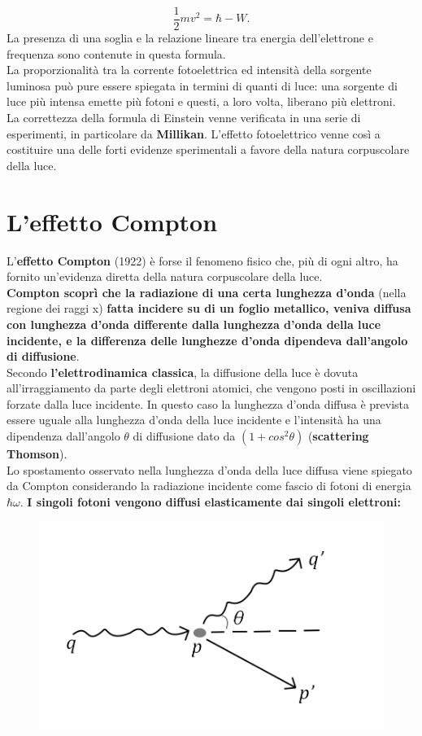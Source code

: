 \documentclass[a4paper,12pt,oneside]{book}
\begin{document}
\begin{equation}
\frac{1}{2}m v^2= \hbar - W.
\end{equation}
La presenza di una soglia e la relazione lineare tra energia dell'elettrone e frequenza sono contenute in questa formula.\\ La proporzionalità tra la corrente fotoelettrica ed intensità della sorgente luminosa può pure essere spiegata in termini di quanti di luce: una sorgente di luce più intensa emette più fotoni e questi, a loro volta, liberano più elettroni.\\ La correttezza della formula di Einstein venne verificata in una serie di esperimenti, in particolare da \textbf{Millikan}. L'effetto fotoelettrico venne così a costituire una delle forti evidenze sperimentali a favore della natura corpuscolare della luce.
\section{L'effetto Compton}
L'\textbf{effetto Compton} (1922) è forse il fenomeno fisico che, più di ogni altro, ha fornito un'evidenza diretta della natura corpuscolare della luce.\\ \textbf{Compton scoprì che la radiazione di una certa lunghezza d'onda} (nella regione dei raggi x) \textbf{fatta incidere su di un foglio metallico, veniva diffusa con lunghezza d'onda differente dalla lunghezza d'onda della luce incidente, e la differenza delle lunghezze d'onda dipendeva dall'angolo di diffusione}.\\
Secondo \textbf{l'elettrodinamica classica}, la diffusione della luce è dovuta all'irraggiamento da parte degli elettroni atomici, che vengono posti in oscillazioni forzate dalla luce incidente. In questo caso la lunghezza d'onda diffusa è prevista essere uguale alla lunghezza d'onda della luce incidente e l'intensità ha una dipendenza dall'angolo $\theta$ di diffusione dato da $(1+cos^2 \theta)$ (\textbf{scattering Thomson}).\\
Lo spostamento osservato nella lunghezza d'onda della luce diffusa viene spiegato da Compton considerando la radiazione incidente come fascio di fotoni di energia $\hbar \omega$. \textbf{I singoli fotoni vengono diffusi elasticamente dai singoli elettroni:}\\
\begin{figure}[!htbp]
\begin{center}
\includegraphics[width=.6\textwidth]{immagini/cap_1/fig_1_3.png}
\end{center}
\end{figure}\\
\end{document}
